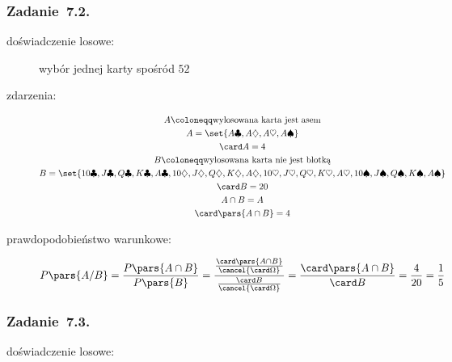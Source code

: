 \subsubsection*{Zadanie~7.2.}
\begin{description}
    \item[doświadczenie losowe:] wybór jednej karty spośród \(52\)
    \item[zdarzenia:]
        \begin{gather*}
            A \coloneqq \text{wylosowana karta jest asem}\\
            A = \set{A\clubsuit, A\diamondsuit, A\heartsuit, A\spadesuit}\\
            \card A = 4\\
            B \coloneqq \text{wylosowana karta nie jest blotką}\\
            B = \set{10\clubsuit, J\clubsuit, Q\clubsuit, K\clubsuit, A\clubsuit, 10\diamondsuit, J\diamondsuit, Q\diamondsuit, K\diamondsuit, A\diamondsuit, 10\heartsuit, J\heartsuit, Q\heartsuit, K\heartsuit, A\heartsuit, 10\spadesuit, J\spadesuit, Q\spadesuit, K\spadesuit, A\spadesuit}\\
            \card B = 20\\
            A \cap B = A\\
            \card\pars{A \cap B} = 4
        \end{gather*}
    \item[prawdopodobieństwo warunkowe:]
        \begin{equation*}
            P\pars{A / B}
                = \frac{P\pars{A \cap B}}{P\pars{B}}
                = \frac{\frac{\card\pars{A \cap B}}{\cancel{\card\Omega}}}{\frac{\card B}{\cancel{\card\Omega}}}
                = \frac{\card\pars{A \cap B}}{\card B}
                = \frac{4}{20}
                = \frac{1}{5}
        \end{equation*}
\end{description}
\subsubsection*{Zadanie~7.3.}
\begin{description}
    \item[doświadczenie losowe:]
\end{description}
